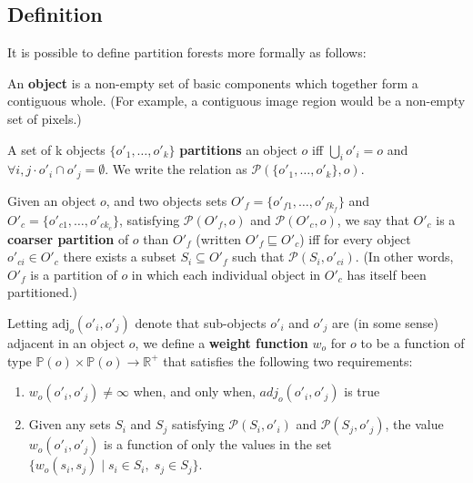 
\subsection{Definition}
\label{sec:ipfs-definition}

It is possible to define partition forests more formally as follows:

\begin{definition}
An \textbf{object} is a non-empty set of basic components which together form a contiguous whole. (For example, a contiguous image region would be a non-empty set of pixels.)
\end{definition}

\begin{definition}
A set of k objects $\{o'_1,\ldots,o'_k\}$ \textbf{partitions} an object $o$ iff $\bigcup_i o'_i = o$ and $\forall i,j \cdot o'_i \cap o'_j = \emptyset$. We write the relation as $\mathcal{P}(\{o'_1,\ldots,o'_k\}, o)$.
\end{definition}

\begin{definition}
Given an object $o$, and two objects sets $O'_f = \{o'_{f1},\ldots,o'_{fk_f}\}$ and $O'_c = \{o'_{c1},\ldots,o'_{ck_c}\}$, satisfying $\mathcal{P}(O'_f,o)$ and $\mathcal{P}(O'_c,o)$, we say that $O'_c$ is a \textbf{coarser partition} of $o$ than $O'_f$ (written $O'_f \sqsubseteq O'_c$) iff for every object $o'_{ci} \in O'_c$ there exists a subset $S_i \subseteq O'_f$ such that $\mathcal{P}(S_i,o'_{ci})$. (In other words, $O'_f$ is a partition of $o$ in which each individual object in $O'_c$ has itself been partitioned.)
\end{definition}

\begin{definition}
Letting $\mbox{adj}_o(o'_i, o'_j)$ denote that sub-objects $o'_i$ and $o'_j$ are (in some sense) adjacent in an object $o$, we define a \textbf{weight function} $w_o$ for $o$ to be a function of type $\mathbb{P}(o) \times \mathbb{P}(o) \to \mathbb{R}^+$ that satisfies the following two requirements:
%
\begin{enumerate}

\item $w_o(o'_i, o'_j) \ne \infty$ when, and only when, $adj_o(o'_i, o'_j)$ is true

\item Given any sets $S_i$ and $S_j$ satisfying $\mathcal{P}(S_i,o'_i)$ and $\mathcal{P}(S_j,o'_j)$, the value $w_o(o'_i, o'_j)$ is a function of only the values in the set $\{w_o(s_i, s_j) \; | \; s_i \in S_i, \; s_j \in S_j\}$.

\end{enumerate}

\end{definition}

